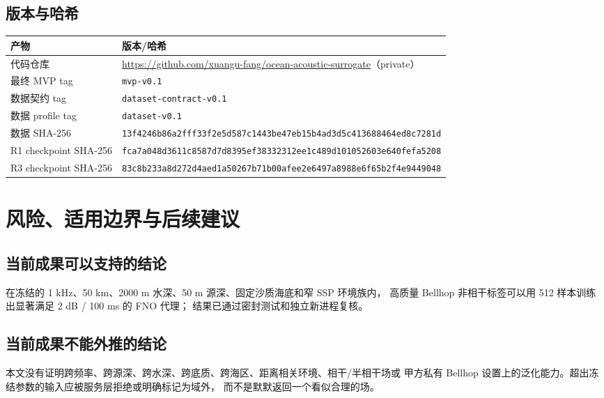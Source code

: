 \documentclass[UTF8,12pt,openany]{ctexrep}
\newcommand{\code}[1]{\texttt{#1}}
\begin{document}
\section{版本与哈希}

\noindent
\begin{tabularx}{\textwidth}{L{4.1cm}Y}
\toprule
产物 & 版本/哈希 \\
\midrule
代码仓库 & \url{https://github.com/xuangu-fang/ocean-acoustic-surrogate}（private） \\
最终 MVP tag & \code{mvp-v0.1} \\
数据契约 tag & \code{dataset-contract-v0.1} \\
数据 profile tag & \code{dataset-v0.1} \\
数据 SHA-256 & \footnotesize\nolinkurl{13f4246b86a2fff33f2e5d587c1443be47eb15b4ad3d5c413688464ed8c7281d} \\
R1 checkpoint SHA-256 & \footnotesize\nolinkurl{fca7a048d3611c8587d7d8395ef38332312ee1c489d101052603e640fefa5208} \\
R3 checkpoint SHA-256 & \footnotesize\nolinkurl{83c8b233a8d272d4aed1a50267b71b00afee2e6497a8988e6f65b2f4e9449048} \\
\bottomrule
\end{tabularx}

\chapter{风险、适用边界与后续建议}
\label{chap:risks}

\section{当前成果可以支持的结论}

\begin{passbox}[可以确认]
在冻结的 1 kHz、50 km、2000 m 水深、50 m 源深、固定沙质海底和窄 SSP 环境族内，
高质量 Bellhop 非相干标签可以用 512 样本训练出显著满足 2 dB / 100 ms 的 FNO 代理；
结果已通过密封测试和独立新进程复核。
\end{passbox}

\section{当前成果不能外推的结论}

\begin{riskbox}[不可直接外推]
本文没有证明跨频率、跨源深、跨水深、跨底质、跨海区、距离相关环境、相干/半相干场或
甲方私有 Bellhop 设置上的泛化能力。超出冻结参数的输入应被服务层拒绝或明确标记为域外，
而不是默默返回一个看似合理的场。
\end{riskbox}
\end{document}
